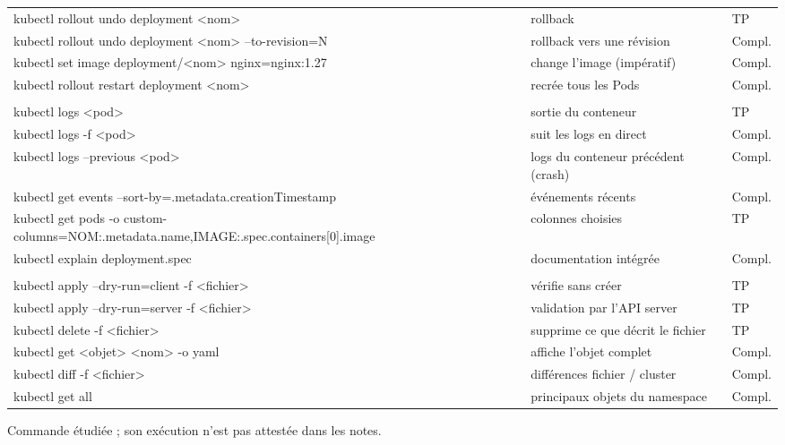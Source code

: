 \documentclass[11pt,a4paper]{article}
\begin{document}
\begin{longtable}{@{}>{\raggedright\arraybackslash\ttfamily\small}p{8.2cm}>{\raggedright\arraybackslash\small}p{5.6cm}>{\centering\arraybackslash\small}p{1.5cm}@{}}
kubectl rollout undo deployment <nom> & rollback & TP \\
kubectl rollout undo deployment <nom> --to-revision=N & rollback vers une révision & Compl. \\
kubectl set image deployment/<nom> nginx=nginx:1.27 & change l'image (impératif) & Compl. \\
kubectl rollout restart deployment <nom> & recrée tous les Pods & Compl. \\
\midrule
\multicolumn{3}{@{}l}{\textbf{Logs et dépannage}} \\
kubectl logs <pod> & sortie du conteneur & TP \\
kubectl logs -f <pod> & suit les logs en direct & Compl. \\
kubectl logs --previous <pod> & logs du conteneur précédent (crash) & Compl. \\
kubectl get events \allowbreak --sort-by=.metadata.creationTimestamp & événements récents & Compl. \\
kubectl get pods -o custom-columns=\allowbreak NOM:.metadata.name,\allowbreak IMAGE:.spec.\allowbreak containers[0].image & colonnes choisies & TP \\
kubectl explain deployment.spec & documentation intégrée & Compl. \\
\midrule
\multicolumn{3}{@{}l}{\textbf{Fichiers YAML et nettoyage}} \\
kubectl apply --dry-run=client -f <fichier> & vérifie sans créer & TP \\
kubectl apply --dry-run=server -f <fichier> & validation par l'API server & TP \\
kubectl delete -f <fichier> & supprime ce que décrit le fichier & TP \\
kubectl get <objet> <nom> -o yaml & affiche l'objet complet & Compl. \\
kubectl diff -f <fichier> & différences fichier / cluster & Compl. \\
kubectl get all & principaux objets du namespace & Compl. \\
\end{longtable}
{\small * Commande étudiée ; son exécution n'est pas attestée dans les notes.\par}
\end{document}
